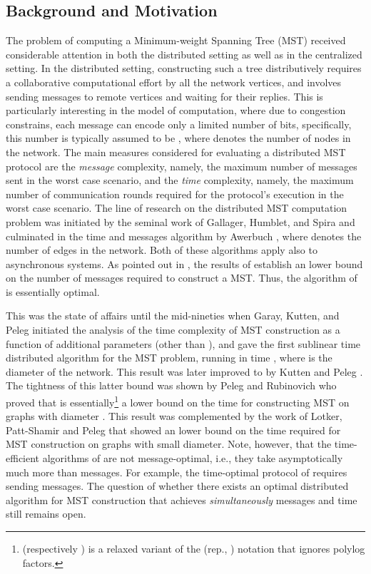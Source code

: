 \documentclass[11pt,letter]{article}
\begin{document}
\subsection{Background and Motivation}
The problem of computing a Minimum-weight Spanning Tree (MST)  received considerable attention in both the 
distributed setting as well as in the  centralized setting. In the distributed setting, constructing such a tree distributively
requires a collaborative computational effort by all the network vertices, 
and involves sending messages to remote vertices and waiting for their replies. This is particularly interesting in the  model of computation, where due to congestion constrains, each message can encode only a limited number of bits, specifically, this number is typically assumed to be , where  denotes the number of nodes in the network.
The main measures considered for evaluating a distributed MST protocol are the {\em message} complexity, namely, the maximum 
number of messages sent in the worst case scenario, 
and the {\em time} complexity, namely, the maximum number of communication rounds 
required for the protocol's execution in the worst case scenario.
The line of research on the distributed MST computation problem was initiated 
by the seminal work of Gallager, Humblet, and Spira \cite{GHS_83} 
and culminated in the  time and  messages algorithm 
by Awerbuch \cite{A87}, where  denotes the number of edges in the network. 
Both of these algorithms apply also to asynchronous systems.
As pointed out in \cite{A87}, the results of 
\cite{AGVP_90,B_80,FL_84} establish an  lower bound 
on the number of messages required to construct a MST.  
Thus, the algorithm of \cite{A87} is essentially optimal. 

This was the state of affairs until the mid-nineties when Garay, Kutten, 
and Peleg \cite{GKP98} initiated the analysis of the time complexity 
of MST construction as a function of additional parameters (other than ), 
and gave the first sublinear time distributed algorithm for the MST problem, 
running in time , where  is the diameter of the network. 
This result was later improved to  by 
Kutten and Peleg \cite{KP_98}.
The tightness of this latter bound was shown by  
Peleg and Rubinovich \cite{PR_00} who proved that 
 is essentially\footnote{ 
(respectively ) is a relaxed variant of the  (rep., ) 
notation that ignores polylog factors.}
a lower bound on the time for constructing MST on graphs with
diameter . This result was complemented by the work 
of Lotker,  Patt-Shamir and  Peleg \cite{LPP_01} that showed an 
 lower bound on the time required for 
MST construction on graphs with small diameter. 
Note, however, that the time-efficient algorithms of \cite{GKP98,KP_98} 
are not message-optimal, i.e., they take asymptotically much more than 
 messages. For example, the time-optimal protocol 
of \cite{KP_98} requires sending  messages. 
The question of whether there exists an optimal distributed algorithm for MST 
construction that achieves {\em simultaneously}  messages 
and  time still remains open.
\end{document}
